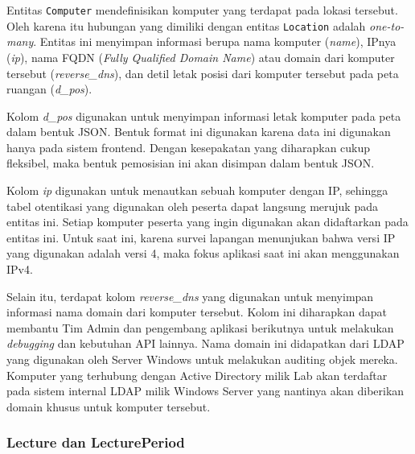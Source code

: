     Entitas \texttt{Computer} mendefinisikan komputer yang terdapat pada lokasi tersebut. Oleh karena
    itu hubungan yang dimiliki dengan entitas \texttt{Location} adalah \textit{one-to-many}.
    Entitas ini menyimpan informasi berupa nama komputer (\textit{name}), IPnya (\textit{ip}),
    nama FQDN (\textit{Fully Qualified Domain Name}) atau domain dari komputer tersebut (\textit{reverse\_dns}),
    dan detil letak posisi dari komputer tersebut pada peta ruangan (\textit{d\_pos}).
    
    Kolom \textit{d\_pos} digunakan untuk menyimpan informasi letak komputer pada peta dalam bentuk
    JSON. Bentuk format ini digunakan karena data ini digunakan hanya pada sistem frontend. Dengan
    kesepakatan yang diharapkan cukup fleksibel, maka bentuk pemosisian ini akan disimpan dalam 
    bentuk JSON.
    
    Kolom \textit{ip} digunakan untuk menautkan sebuah komputer dengan IP, sehingga tabel otentikasi
    yang digunakan oleh peserta dapat langsung merujuk pada entitas ini. Setiap komputer peserta
    yang ingin digunakan akan didaftarkan pada entitas ini. Untuk saat ini, karena survei lapangan
    menunjukan bahwa versi IP yang digunakan adalah versi 4, maka fokus aplikasi saat ini akan
    menggunakan IPv4.
    
    Selain itu, terdapat kolom \textit{reverse\_dns} yang digunakan untuk menyimpan informasi nama domain dari
    komputer tersebut. Kolom ini diharapkan dapat membantu Tim Admin dan pengembang aplikasi
    berikutnya untuk melakukan \textit{debugging} dan kebutuhan API lainnya. Nama domain ini didapatkan dari
    LDAP yang digunakan oleh Server Windows untuk melakukan auditing objek mereka. Komputer yang
    terhubung dengan Active Directory milik Lab akan terdaftar pada sistem internal LDAP milik Windows
    Server yang nantinya akan diberikan domain khusus untuk komputer tersebut.

\subsubsection{Lecture dan LecturePeriod}

